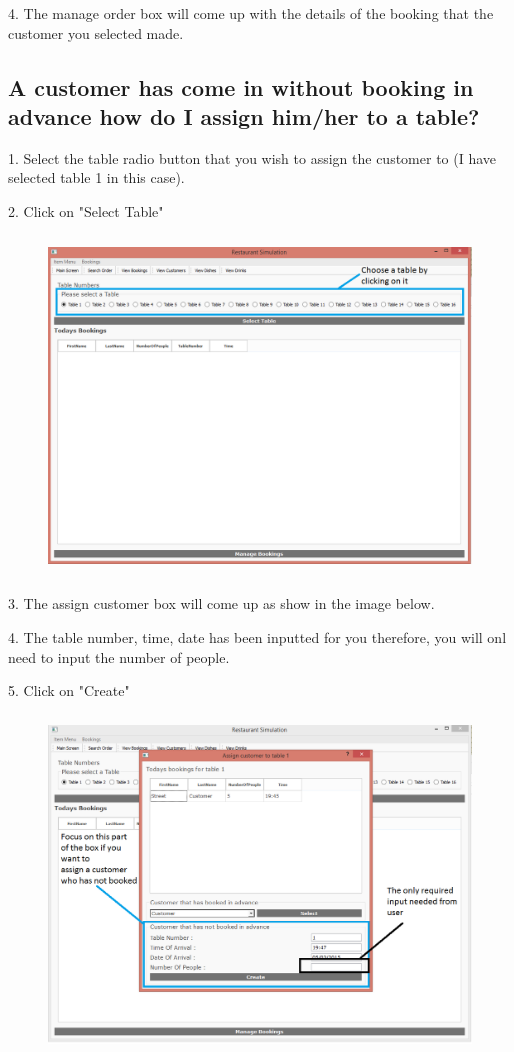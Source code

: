 4. The manage order box will come up with the details of the booking that the customer you selected made.

\newpage
\subsection{A customer has come in without booking in advance how do I assign him/her to a table?}

1. Select the table radio button  that you wish to assign the customer to (I have selected table 1 in this case).

2. Click on "Select Table"

\begin{figure}[H]
    \includegraphics[height = 9cm]{./Manual/images/AssignCust1} 
    \caption{} \label{fig:assigncust1}
\end{figure}

3. The assign customer box will come up as show in the image below.

4. The table number, time, date has been inputted for you therefore, you will onl need to input the number of people.

5. Click on "Create"
\begin{figure}[H]
    \includegraphics[height = 9cm]{./Manual/images/AssignCust2} 
    \caption{} \label{fig:assigncust2}
\end{figure}

